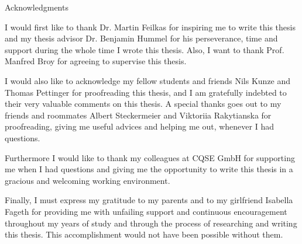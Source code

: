 \thispagestyle{empty}

\vspace*{20mm}

\begin{center}
{ Acknowledgments}
\end{center}

\vspace{10mm}
I would first like to thank Dr. Martin Feilkas for inspiring me to write this thesis and my thesis advisor Dr. Benjamin Hummel for his perseverance, time and support during the whole time I wrote this thesis.
Also, I want to thank Prof. Manfred Broy for agreeing to supervise this thesis.

I would also like to acknowledge my fellow students and friends Nils Kunze and Thomas Pettinger for proofreading this thesis, and I am gratefully indebted to their very valuable comments on this thesis.
A special thanks goes out to my friends and roommates Albert Steckermeier and Viktoriia Rakytianska for proofreading, giving me useful advices and helping me out, whenever I had questions.

Furthermore I would like to thank my colleagues at CQSE GmbH for supporting me when I had questions and giving me the opportunity to write this thesis in a gracious and welcoming working environment.

Finally, I must express my gratitude to my parents and to my girlfriend Isabella Fageth for providing me with unfailing support and continuous encouragement throughout my years of study and through the process of researching and writing this thesis.
This accomplishment would not have been possible without them.

\cleardoublepage{}
